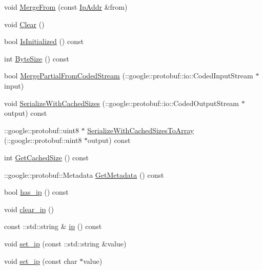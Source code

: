 \begin{DoxyCompactItemize}
void \hyperlink{class_i_m_1_1_base_define_1_1_ip_addr_a34dc1e30676d5d70438531035d510c1d}{Merge\+From} (const \hyperlink{class_i_m_1_1_base_define_1_1_ip_addr}{Ip\+Addr} \&from)
\item 
void \hyperlink{class_i_m_1_1_base_define_1_1_ip_addr_ab48196089eb3486e980e0192725419dc}{Clear} ()
\item 
bool \hyperlink{class_i_m_1_1_base_define_1_1_ip_addr_a967350b5540e855f2b0ce2653d275038}{Is\+Initialized} () const 
\item 
int \hyperlink{class_i_m_1_1_base_define_1_1_ip_addr_ab21f1366e74bf3b8d3646c5fc7c3f7a0}{Byte\+Size} () const 
\item 
bool \hyperlink{class_i_m_1_1_base_define_1_1_ip_addr_aa03a436b64dd5a742714681e53dd4ad1}{Merge\+Partial\+From\+Coded\+Stream} (\+::google\+::protobuf\+::io\+::\+Coded\+Input\+Stream $\ast$input)
\item 
void \hyperlink{class_i_m_1_1_base_define_1_1_ip_addr_ae2a43f37c85642c9e170dfecacf682f5}{Serialize\+With\+Cached\+Sizes} (\+::google\+::protobuf\+::io\+::\+Coded\+Output\+Stream $\ast$output) const 
\item 
\+::google\+::protobuf\+::uint8 $\ast$ \hyperlink{class_i_m_1_1_base_define_1_1_ip_addr_a803e4466b2ee4db2a71aa0760e58533f}{Serialize\+With\+Cached\+Sizes\+To\+Array} (\+::google\+::protobuf\+::uint8 $\ast$output) const 
\item 
int \hyperlink{class_i_m_1_1_base_define_1_1_ip_addr_a7ad7ed6695790fe44aa6ce3cfcfaf509}{Get\+Cached\+Size} () const 
\item 
\+::google\+::protobuf\+::\+Metadata \hyperlink{class_i_m_1_1_base_define_1_1_ip_addr_a44e600cc802bb1f570b0dd6f3a06eab0}{Get\+Metadata} () const 
\item 
bool \hyperlink{class_i_m_1_1_base_define_1_1_ip_addr_a8b23ce8a3790c0750e3e96a1086e0f81}{has\+\_\+ip} () const 
\item 
void \hyperlink{class_i_m_1_1_base_define_1_1_ip_addr_ad8d999cea0a27d1b9f17a445c43f358a}{clear\+\_\+ip} ()
\item 
const \+::std\+::string \& \hyperlink{class_i_m_1_1_base_define_1_1_ip_addr_a4950efb8280c5ef13651698c24332e43}{ip} () const 
\item 
void \hyperlink{class_i_m_1_1_base_define_1_1_ip_addr_a3e1c9bbd5535a6b0a9dc5cfb9ff8699a}{set\+\_\+ip} (const \+::std\+::string \&value)
\item 
void \hyperlink{class_i_m_1_1_base_define_1_1_ip_addr_a81c5a2b87ee25453c50cd1b010d41334}{set\+\_\+ip} (const char $\ast$value)
\item 

\end{DoxyCompactItemize}
